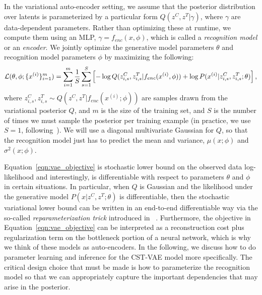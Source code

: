 In the variational auto-encoder setting, we assume that the posterior
distribution over latents is parameterized by a particular form 
 $Q(z^C, z^T|\gamma)$,
where $\gamma$ are data-dependent parameters.
Rather than optimizing these at runtime,
we compute them using 
an MLP, $\gamma=f_{enc}(x,\phi)$, which is called a \emph{recognition model} or an
\emph{encoder}.
We jointly optimize the generative model parameters $\theta$ and
recognition model parameters $\phi$ by maximizing the following:
\begin{equation}\label{eqn:vae_objective}\footnotesize
\mathcal{L}(\theta, \phi; \{x^{(i)}\}_{i=1}^m)
	= \sum_{i=1}^m \frac{1}{S}\sum_{s=1}^S \left[-\log
          Q(z_{i,s}^C, z_{i,s}^T | f_{enc}(x^{(i)},\phi)) 
+ \log P(x^{(i)} | z_{i,s}^C, z_{i,s}^T; \theta) \right],
\end{equation}
where $z_{i,s}^C, z_{i,s}^T \sim Q(z^C, z^T | f_{enc}(x^{(i)};\phi)) $ are
samples drawn from the variational posterior $Q$, and $m$ is the size
of the training set,
and
$S$ is the number of times we must sample the posterior per training example
(in practice, we use $S=1$, following~\cite{Kingma2014}).
We will use a diagonal multivariate Gaussian for $Q$, so that
the recognition model just has to predict the mean and  variance,
 $\mu(x;\phi)$ and $\sigma^2(x;\phi)$.


Equation~\ref{eqn:vae_objective} is stochastic lower bound on the observed data log-likelihood and interestingly,
is differentiable with respect to parameters $\theta$ and $\phi$ in certain situations. In particular,
when $Q$ is Gaussian and the likelihood under the generative model $P(x|z^C,z^T; \theta)$ is differentiable, 
then the stochastic variational lower bound can be written in an end-to-end
differentiable way via the so-called \emph{reparameterization trick} introduced in ~\cite{Kingma2014}.
Furthermore, the objective in Equation~\ref{eqn:vae_objective} can be interpreted as a reconstruction cost plus regularization term on the 
bottleneck portion
of a neural network, which is why we think of these models as auto-encoders.  
In the following, we discuss how to do parameter learning and inference for the CST-VAE model more specifically.
The critical design choice that must be made is how to parameterize  the recognition model so that we can 
appropriately capture the important dependencies that may arise in the posterior.
\vspace{-3mm}

